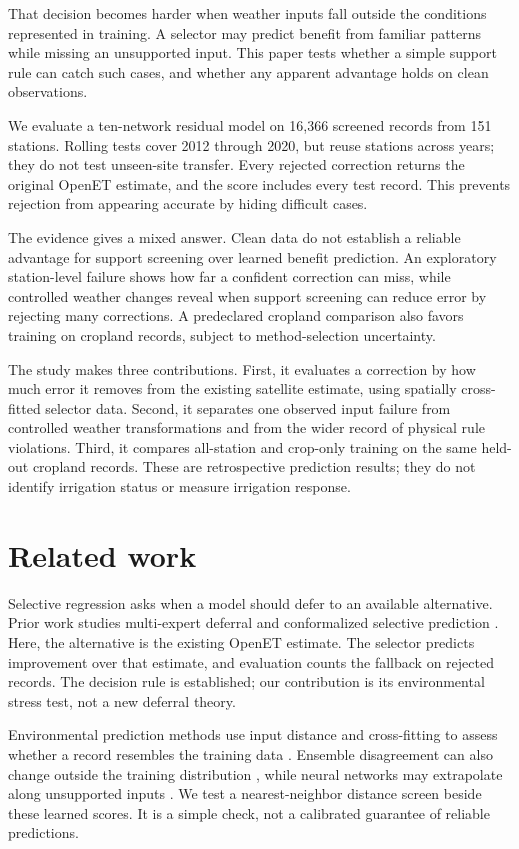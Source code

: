 \documentclass[10pt,letterpaper]{article}
\begin{document}
That decision becomes harder when weather inputs fall outside the conditions represented in training.
A selector may predict benefit from familiar patterns while missing an unsupported input.
This paper tests whether a simple support rule can catch such cases, and whether any apparent advantage holds on clean observations.

We evaluate a ten-network residual model on 16,366 screened records from 151 stations.
Rolling tests cover 2012 through 2020, but reuse stations across years; they do not test unseen-site transfer.
Every rejected correction returns the original OpenET estimate, and the score includes every test record.
This prevents rejection from appearing accurate by hiding difficult cases.

The evidence gives a mixed answer.
Clean data do not establish a reliable advantage for support screening over learned benefit prediction.
An exploratory station-level failure shows how far a confident correction can miss, while controlled weather changes reveal when support screening can reduce error by rejecting many corrections.
A predeclared cropland comparison also favors training on cropland records, subject to method-selection uncertainty.

The study makes three contributions.
First, it evaluates a correction by how much error it removes from the existing satellite estimate, using spatially cross-fitted selector data.
Second, it separates one observed input failure from controlled weather transformations and from the wider record of physical rule violations.
Third, it compares all-station and crop-only training on the same held-out cropland records.
These are retrospective prediction results; they do not identify irrigation status or measure irrigation response.
\clearpage\twocolumn
\section{Related work}
Selective regression asks when a model should defer to an available alternative.
Prior work studies multi-expert deferral and conformalized selective prediction \citep{mao2024,sokol2026}.
Here, the alternative is the existing OpenET estimate.
The selector predicts improvement over that estimate, and evaluation counts the fallback on rejected records.
The decision rule is established; our contribution is its environmental stress test, not a new deferral theory.

Environmental prediction methods use input distance and cross-fitting to assess whether a record resembles the training data \citep{meyer2021,nguyen2026}.
Ensemble disagreement can also change outside the training distribution \citep{laksh2017,mathelin2023}, while neural networks may extrapolate along unsupported inputs \citep{xu2021}.
We test a nearest-neighbor distance screen beside these learned scores.
It is a simple check, not a calibrated guarantee of reliable predictions.
\end{document}
